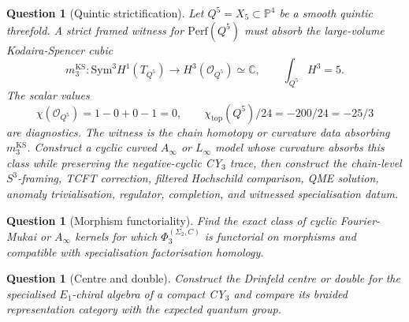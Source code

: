 \documentclass[11pt]{article}
\newtheorem{question}[theorem]{Question}
\begin{document}
\begin{question}[Quintic strictification]
\label{q:compact-strictification}
Let $Q^5=X_5\subset\mathbb P^4$ be a smooth quintic threefold.  A
strict framed witness for $\mathrm{Perf}(Q^5)$ must absorb the
large-volume Kodaira-Spencer cubic
\[
  m^{\mathrm{KS}}_3\colon
  \mathrm{Sym}^3 H^1(T_{Q^5})\longrightarrow
  H^3(\mathcal O_{Q^5})\simeq\mathbb C,
  \qquad
  \int_{Q^5}H^3=5.
\]
The scalar values
\[
  \chi(\mathcal O_{Q^5})=1-0+0-1=0,\qquad
  \chi_{\mathrm{top}}(Q^5)/24=-200/24=-25/3
\]
are diagnostics.  The witness is the chain homotopy or curvature data
absorbing $m^{\mathrm{KS}}_3$.
Construct a cyclic curved $A_\infty$ or $L_\infty$ model whose curvature
absorbs this class while preserving the negative-cyclic CY$_3$ trace,
then construct the chain-level $S^3$-framing, TCFT correction, filtered
Hochschild comparison, QME solution, anomaly trivialisation, regulator,
completion, and witnessed specialisation datum.
\end{question}

\begin{question}[Morphism functoriality]
\label{q:morphism-functoriality}
Find the exact class of cyclic Fourier-Mukai or $A_\infty$ kernels for
which $\Phi^{(\Sigma_2,C)}_3$ is functorial on morphisms and compatible
with specialisation factorisation homology.
\end{question}

\begin{question}[Centre and double]
\label{q:center-double}
Construct the Drinfeld centre or double for the specialised
$E_1$-chiral algebra of a compact CY$_3$ and compare its braided
representation category with the expected quantum group.
\end{question}
\end{document}
